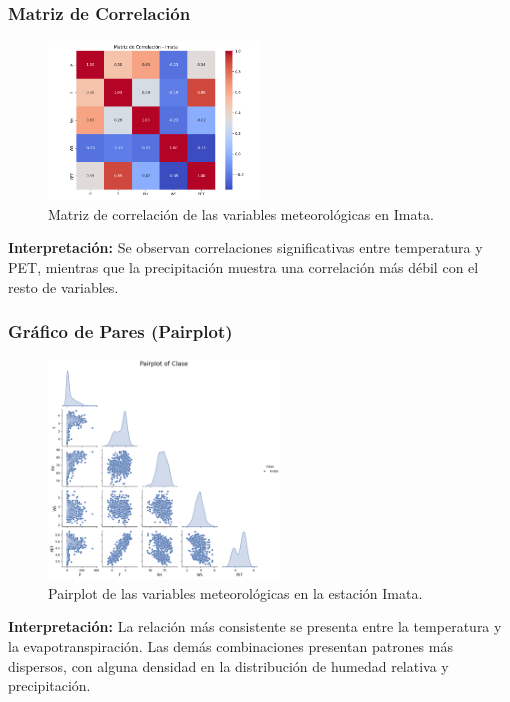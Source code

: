 \subsubsection*{Matriz de Correlación}
\begin{figure}[H]
\centering
\includegraphics[width=0.5\textwidth]{resultados/por_estacion_meteorologica/Imata/matriz_correlacion.png}
\caption{Matriz de correlación de las variables meteorológicas en Imata.}
\label{fig:imata_corr}
\end{figure}
\textbf{Interpretación:} Se observan correlaciones significativas entre temperatura y PET, mientras que la precipitación muestra una correlación más débil con el resto de variables.

\subsubsection*{Gráfico de Pares (Pairplot)}
\begin{figure}[H]
\centering
\includegraphics[width=0.55\textwidth]{resultados/por_estacion_meteorologica/Imata/pairplot.png}
\caption{Pairplot de las variables meteorológicas en la estación Imata.}
\label{fig:imata_pairplot}
\end{figure}
\textbf{Interpretación:} La relación más consistente se presenta entre la temperatura y la evapotranspiración. Las demás combinaciones presentan patrones más dispersos, con alguna densidad en la distribución de humedad relativa y precipitación.


